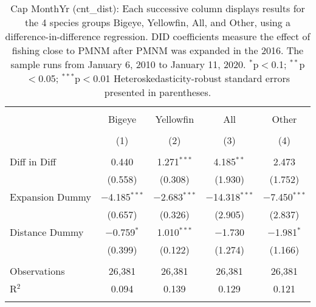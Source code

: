 
\begin{table}[!htbp] \centering 
  \caption{Cap MonthYr (cnt_dist): Each successive column displays results for the 4 species groups Bigeye, Yellowfin, All, and Other, using a difference-in-difference regression. DID coefficients measure the effect of fishing close to PMNM after PMNM was expanded in the 2016. The sample runs from January 6, 2010 to January 11, 2020. $^{*}$p$<$0.1; $^{**}$p$<$0.05; $^{***}$p$<$0.01 Heteroskedasticity-robust standard errors presented in parentheses.} 
  \label{tbl:timeFEcnt_dist} 
\begin{tabular}{@{\extracolsep{5pt}}lcccc} 
\\[-1.8ex]\hline 
\hline \\[-1.8ex] 
 & Bigeye & Yellowfin & All & Other \\ 
\\[-1.8ex] & (1) & (2) & (3) & (4)\\ 
\hline \\[-1.8ex] 
 Diff in Diff & 0.440 & 1.271$^{***}$ & 4.185$^{**}$ & 2.473 \\ 
  & (0.558) & (0.308) & (1.930) & (1.752) \\ 
  Expansion Dummy & $-$4.185$^{***}$ & $-$2.683$^{***}$ & $-$14.318$^{***}$ & $-$7.450$^{***}$ \\ 
  & (0.657) & (0.326) & (2.905) & (2.837) \\ 
  Distance Dummy & $-$0.759$^{*}$ & 1.010$^{***}$ & $-$1.730 & $-$1.981$^{*}$ \\ 
  & (0.399) & (0.122) & (1.274) & (1.166) \\ 
 \hline \\[-1.8ex] 
Observations & 26,381 & 26,381 & 26,381 & 26,381 \\ 
R$^{2}$ & 0.094 & 0.139 & 0.129 & 0.121 \\ 
\hline 
\hline \\[-1.8ex] 
\end{tabular} 
\end{table} 
